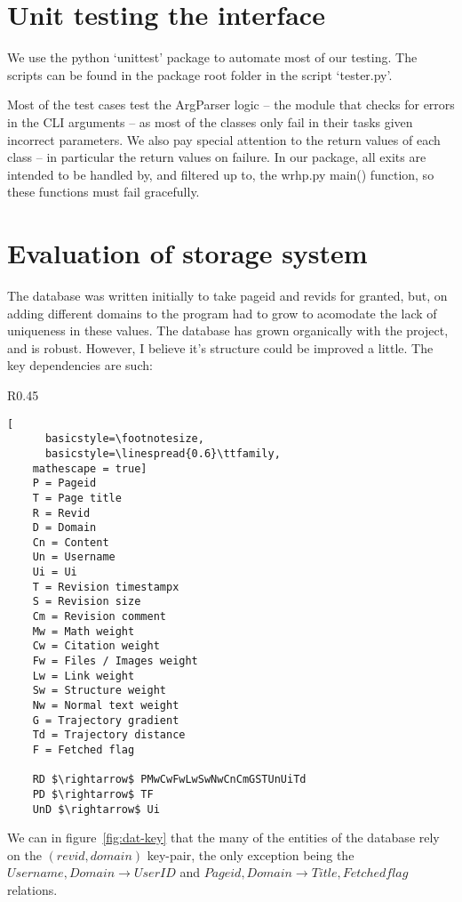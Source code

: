 \section{Unit testing the interface}
We use the python `unittest' package to automate most of our
testing. The scripts can be found in the package root folder in the
script `tester.py'.

Most of the test cases test the ArgParser logic -- the module that
checks for errors in the CLI arguments -- as most of the
classes only fail in their tasks given incorrect parameters. We also
pay special attention to the return values of each class -- in
particular the return values on failure. In our package, all exits are
intended to be handled by, and filtered up to, the wrhp.py main()
function, so these functions must fail gracefully.

\section{Evaluation of storage system}
The database was written initially to take pageid and revids for
granted, but, on adding different domains to the program had to grow
to acomodate the lack of uniqueness in these values. The database has
grown organically with the project, and is robust. However, I believe
it's structure could be improved a little. The key dependencies are
such:

\begin{wrapfigure}{R}{0.45\linewidth}
  \begin{lstlisting}[
      basicstyle=\footnotesize,
      basicstyle=\linespread{0.6}\ttfamily,
    mathescape = true]
    P = Pageid
    T = Page title
    R = Revid
    D = Domain
    Cn = Content
    Un = Username
    Ui = Ui
    T = Revision timestampx
    S = Revision size
    Cm = Revision comment
    Mw = Math weight
    Cw = Citation weight
    Fw = Files / Images weight
    Lw = Link weight
    Sw = Structure weight
    Nw = Normal text weight
    G = Trajectory gradient
    Td = Trajectory distance
    F = Fetched flag

    RD $\rightarrow$ PMwCwFwLwSwNwCnCmGSTUnUiTd
    PD $\rightarrow$ TF
    UnD $\rightarrow$ Ui
  \end{lstlisting}
  \caption{Database entities and key dependencies}
  \label{fig:dat-key}
\end{wrapfigure}

We can in figure~\ref{fig:dat-key} that the many of the entities of
the database rely on the $(revid, domain)$ key-pair, the only
exception being the $Username, Domain \rightarrow UserID$ and $Pageid,
Domain \rightarrow Title, Fetched flag$ relations. 

